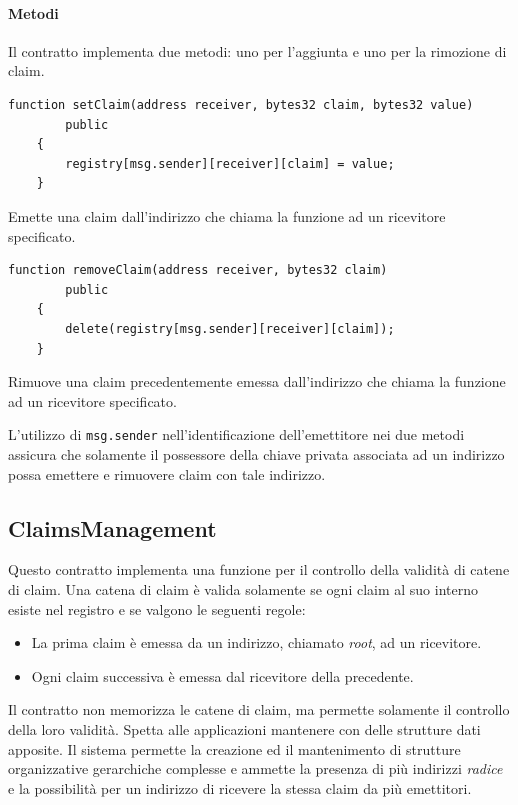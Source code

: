 \paragraph{Metodi}
Il contratto implementa due metodi: uno per l'aggiunta e uno per la rimozione di claim.

\noindent
\begin{lstlisting}[language=Solidity]
    function setClaim(address receiver, bytes32 claim, bytes32 value)
        public
    {
        registry[msg.sender][receiver][claim] = value;
    }
\end{lstlisting}
Emette una claim dall'indirizzo che chiama la funzione ad un ricevitore specificato.

\noindent
\begin{lstlisting}[language=Solidity]
    function removeClaim(address receiver, bytes32 claim)
        public
    {
        delete(registry[msg.sender][receiver][claim]);
    }
\end{lstlisting}
Rimuove una claim precedentemente emessa dall'indirizzo che chiama la funzione ad un ricevitore specificato.

L'utilizzo di \texttt{msg.sender} nell'identificazione dell'emettitore nei due metodi assicura che solamente il possessore della chiave privata associata ad un indirizzo possa emettere e rimuovere claim con tale indirizzo.

\subsection{ClaimsManagement}
\label{claims-management}
Questo contratto implementa una funzione per il controllo della validità di catene di claim. Una catena di claim è valida solamente se ogni claim al suo interno esiste nel registro e se valgono le seguenti regole:
\begin{itemize}
    \item La prima claim è emessa da un indirizzo, chiamato \emph{root}, ad un ricevitore.
    \item Ogni claim successiva è emessa dal ricevitore della precedente.
\end{itemize}

Il contratto non memorizza le catene di claim, ma permette solamente il controllo della loro validità. Spetta alle applicazioni mantenere con delle strutture dati apposite. Il sistema permette la creazione ed il mantenimento di strutture organizzative gerarchiche complesse e ammette la presenza di più indirizzi \emph{radice} e la possibilità per un indirizzo di ricevere la stessa claim da più emettitori.

